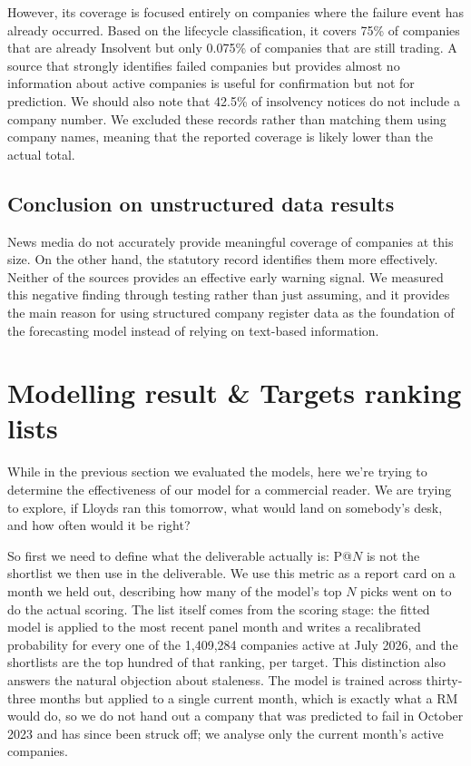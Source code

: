 \documentclass[    author={Samuel Menon Demelo; Sneha Saphala Ram Prasad; 
Viktor Ander Lindholm; Vishal Khatri},
               supervisor={Prof. Fernando Moreno-Pino},
                   degree={MSc},
                    title={Lloyds Commercial Banking Intelligence},
                 subtitle={Ranking SME Lending, Risk and Growth Prospects for Lloyds Banking Group},
                     type={},
                     year={2026}]{dissertation}
\begin{document}
However, its coverage is focused entirely on companies where the failure event has already occurred. Based on the lifecycle classification, it covers 75\% of companies that are already Insolvent but only 0.075\% of companies that are still trading. A source that strongly identifies failed companies but provides almost no information about active companies is useful for confirmation but not for prediction. We should also note that 42.5\% of insolvency notices do not include a company number. We excluded these records rather than matching them using company names, meaning that the reported coverage is likely lower than the actual total.

\subsection{Conclusion on unstructured data results}

News media do not accurately provide meaningful coverage of companies at this size. On the other hand, the statutory record identifies them more effectively. Neither of the sources provides an effective early warning signal. We measured this negative finding through testing rather than just assuming, and it provides the main reason for using structured company register data as the foundation of the forecasting model instead of relying on text-based information.

\section{Modelling result \& Targets ranking lists}
While in the previous section we evaluated the models, here we're trying to determine the effectiveness of our model for a commercial reader. We are trying to explore, if Lloyds ran this tomorrow, what would land on somebody's desk, and how often would it be right?

So first we need to define what the deliverable actually is: P@$N$ is not the shortlist we then use in the deliverable. We use this metric as a report card on a month we held out, describing how many of the model's top $N$ picks went on to do the actual scoring. The list itself comes from the scoring stage: the fitted model is applied to the most recent panel month and writes a recalibrated probability for every one of the 1,409,284 companies active at July 2026, and the shortlists are the top hundred of that ranking, per target. This distinction also answers the natural objection about staleness. The model is trained across thirty-three months but applied to a single current month, which is exactly what a RM would do, so we do not hand out a company that was predicted to fail in October 2023 and has since been struck off; we analyse only the current month's active companies.
\end{document}
